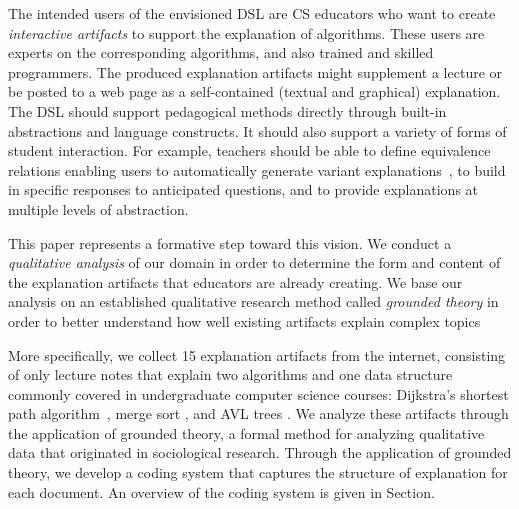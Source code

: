 \documentclass[sigconf]{acmart}
\begin{document}
The intended users of the envisioned DSL are CS educators who want to create
\emph{interactive artifacts} to support the explanation of algorithms. These
users are experts on the corresponding algorithms, and also trained and skilled
programmers. The produced explanation artifacts might supplement a lecture or
be posted to a web page as a self-contained (textual and graphical)
explanation.
%
The DSL should support pedagogical methods directly through built-in
abstractions and language constructs. It should also support a variety of forms
of student interaction. For example, teachers should be able to define
equivalence relations enabling users to automatically generate variant
explanations~\cite{EW13jvlc}, to build in specific responses to anticipated
questions, and to provide explanations at multiple levels of abstraction.


This paper represents a formative step toward this vision. We conduct a
\emph{qualitative analysis} of our domain in order to determine the form and
content of the explanation artifacts that educators are already creating.
%
We base our analysis on an established qualitative research method called
\emph{grounded theory} in order to better understand how well existing artifacts
explain complex topics


More specifically, we collect 15 explanation artifacts from the internet,
consisting of only lecture notes that explain two algorithms and one
data structure commonly covered in undergraduate computer science courses:
Dijkstra's shortest path algorithm~\cite[pp.~137--142]{KT06}, merge sort
\cite[210--214]{KT06}, and AVL trees \cite[pp.~458--475]{KnuthArt3}.
%
We analyze these artifacts through the application of grounded theory,
 a formal method
for analyzing qualitative data that originated in sociological research. Through
the application of grounded theory, we develop a coding system that captures
the structure of explanation for each document. An overview of the coding system
is given in Section.

\end{document}
